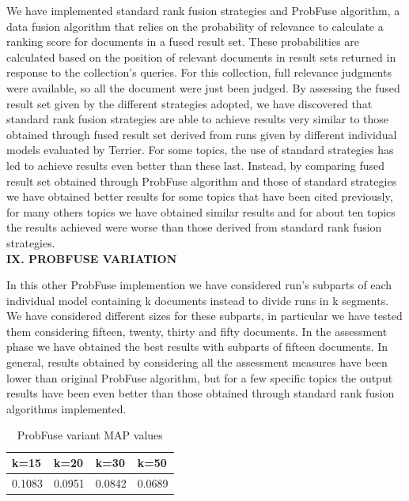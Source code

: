 \documentclass[12pt,journal]{IEEEtran}
\begin{document}
We have implemented standard rank fusion strategies and ProbFuse algorithm, a data fusion algorithm that relies on the probability of relevance to calculate a ranking score for documents in a fused result set.
These probabilities are calculated based on the position of relevant documents in result sets returned in response to the collection’s queries. For this collection, full relevance judgments were available, so all the document were just been judged. 
By assessing the fused result set given by the different strategies adopted, we have discovered that standard rank fusion strategies are able to achieve results very similar to those obtained through fused result set derived from runs given by different individual models evaluated by Terrier. For some topics, the use of standard strategies has led to achieve results even better than these last. Instead, by comparing fused result set obtained through ProbFuse algorithm and those of standard strategies we have obtained better results for some topics that have been cited previously, for many others topics we have obtained similar results and for about ten topics the results achieved were worse than those derived from standard rank fusion strategies. \\

\textbf{IX.	PROBFUSE VARIATION}

In this other ProbFuse implemention we have considered run's subparts of each individual model containing k documents instead to divide runs in k segments. We have considered different sizes for these subparts, in particular we have tested them considering fifteen, twenty, thirty and fifty documents. In the assessment phase we have obtained the best results with subparts of fifteen documents. In general, results obtained by considering all the assessment measures have been lower than original ProbFuse algorithm, but for a few specific topics the output results have been even better than those obtained through standard rank fusion algorithms implemented. 

\begin{table}[h!]
\centering
\caption{ProbFuse variant MAP values}
\begin{tabular}{|l|l|l|l|}
\hline
k=15 & k=20 & k=30 & k=50 \\ \hline
0.1083 & 0.0951 & 0.0842 & 0.0689  \\ \hline
\end{tabular}
\end{table}
\end{document}
